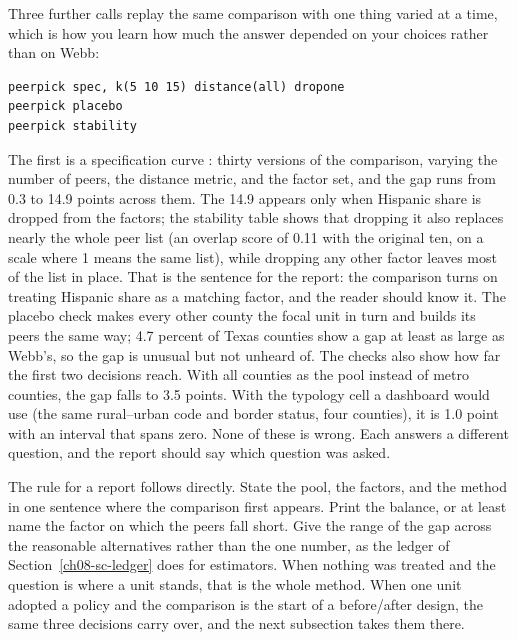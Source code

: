Three further calls replay the same comparison with one thing varied at a time, which is how you learn how much the answer depended on your choices rather than on Webb:
\par
{\footnotesize
\begin{verbatim}
peerpick spec, k(5 10 15) distance(all) dropone
peerpick placebo
peerpick stability
\end{verbatim}
}
The first is a specification curve \parencite{simonsohn2020speccurve}: thirty versions of the comparison, varying the number of peers, the distance metric, and the factor set, and the gap runs from 0.3 to 14.9 points across them. The 14.9 appears only when Hispanic share is dropped from the factors; the stability table shows that dropping it also replaces nearly the whole peer list (an overlap score of 0.11 with the original ten, on a scale where 1 means the same list), while dropping any other factor leaves most of the list in place. That is the sentence for the report: the comparison turns on treating Hispanic share as a matching factor, and the reader should know it. The placebo check makes every other county the focal unit in turn and builds its peers the same way; 4.7 percent of Texas counties show a gap at least as large as Webb's, so the gap is unusual but not unheard of. The checks also show how far the first two decisions reach. With all counties as the pool instead of metro counties, the gap falls to 3.5 points. With the typology cell a dashboard would use (the same rural--urban code and border status, four counties), it is 1.0 point with an interval that spans zero. None of these is wrong. Each answers a different question, and the report should say which question was asked.

The rule for a report follows directly. State the pool, the factors, and the method in one sentence where the comparison first appears. Print the balance, or at least name the factor on which the peers fall short. Give the range of the gap across the reasonable alternatives rather than the one number, as the ledger of Section~\ref{ch08-sc-ledger} does for estimators. When nothing was treated and the question is where a unit stands, that is the whole method. When one unit adopted a policy and the comparison is the start of a before/after design, the same three decisions carry over, and the next subsection takes them there.


